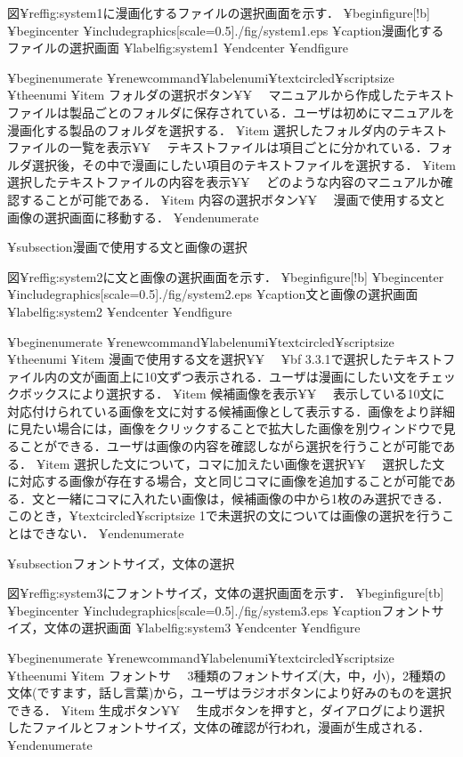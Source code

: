 図¥ref{fig:system1}に漫画化するファイルの選択画面を示す．
¥begin{figure}[!b]
 ¥begin{center}
  ¥includegraphics[scale=0.5]{./fig/system1.eps}
  ¥caption{漫画化するファイルの選択画面}
  ¥label{fig:system1}
 ¥end{center}
¥end{figure}

¥begin{enumerate}
¥renewcommand{¥labelenumi}{¥textcircled{¥scriptsize ¥theenumi}}
¥item フォルダの選択ボタン¥¥
　マニュアルから作成したテキストファイルは製品ごとのフォルダに保存されている．ユーザは初めにマニュアルを漫画化する製品のフォルダを選択する．
¥item 選択したフォルダ内のテキストファイルの一覧を表示¥¥
　テキストファイルは項目ごとに分かれている．フォルダ選択後，その中で漫画にしたい項目のテキストファイルを選択する．
¥item 選択したテキストファイルの内容を表示¥¥
　どのような内容のマニュアルか確認することが可能である．
¥item 内容の選択ボタン¥¥
　漫画で使用する文と画像の選択画面に移動する．
¥end{enumerate}

¥subsection{漫画で使用する文と画像の選択}

図¥ref{fig:system2}に文と画像の選択画面を示す．
¥begin{figure}[!b]
 ¥begin{center}
  ¥includegraphics[scale=0.5]{./fig/system2.eps}
  ¥caption{文と画像の選択画面}
  ¥label{fig:system2}
 ¥end{center}
¥end{figure}

¥begin{enumerate}
¥renewcommand{¥labelenumi}{¥textcircled{¥scriptsize ¥theenumi}}
¥item 漫画で使用する文を選択¥¥
　{¥bf 3.3.1}で選択したテキストファイル内の文が画面上に10文ずつ表示される．ユーザは漫画にしたい文をチェックボックスにより選択する．
¥item 候補画像を表示¥¥
　表示している10文に対応付けられている画像を文に対する候補画像として表示する．画像をより詳細に見たい場合には，画像をクリックすることで拡大した画像を別ウィンドウで見ることができる．ユーザは画像の内容を確認しながら選択を行うことが可能である．
¥item 選択した文について，コマに加えたい画像を選択¥¥
　選択した文に対応する画像が存在する場合，文と同じコマに画像を追加することが可能である．文と一緒にコマに入れたい画像は，候補画像の中から1枚のみ選択できる．このとき，¥textcircled{¥scriptsize 1}で未選択の文については画像の選択を行うことはできない．
¥end{enumerate}

¥subsection{フォントサイズ，文体の選択}

図¥ref{fig:system3}にフォントサイズ，文体の選択画面を示す．
¥begin{figure}[tb]
 ¥begin{center}
  ¥includegraphics[scale=0.5]{./fig/system3.eps}
  ¥caption{フォントサイズ，文体の選択画面}
  ¥label{fig:system3}
 ¥end{center}
¥end{figure}

¥begin{enumerate}
¥renewcommand{¥labelenumi}{¥textcircled{¥scriptsize ¥theenumi}}
¥item フォントサ
　3種類のフォントサイズ(大，中，小)，2種類の文体(ですます，話し言葉)から，ユーザはラジオボタンにより好みのものを選択できる． 
¥item 生成ボタン¥¥
　生成ボタンを押すと，ダイアログにより選択したファイルとフォントサイズ，文体の確認が行われ，漫画が生成される．
¥end{enumerate}

